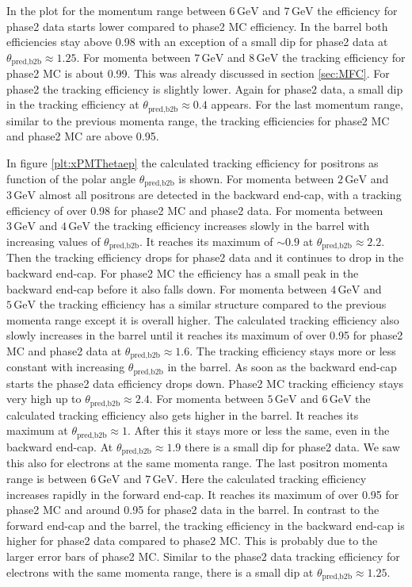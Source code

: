 \documentclass[a4paper,11pt,twosided,final,german,openbib,pdftex,listof=totoc,bibliography=totoc]{scrbook}
\begin{document}
In the plot for the momentum range between $6\,\textrm{GeV}$ and $7\,\textrm{GeV}$ the efficiency for phase2 data starts lower compared to phase2 MC efficiency. In the barrel both efficiencies stay above 0.98 with an exception of a small dip for phase2 data at $\theta_{\textrm{pred,b2b}} \approx 1.25$. 
For momenta  between $7\,\textrm{GeV}$ and $8\,\textrm{GeV}$ the tracking efficiency for phase2 MC is about 0.99. This was already discussed in section \ref{sec:MFC}. For phase2 the tracking efficiency is slightly lower. Again for phase2 data, a small dip in the tracking efficiency at $\theta_{\textrm{pred,b2b}} \approx 0.4$ appears. 
For the last momentum range, similar to the previous momenta range, the tracking efficiencies for phase2 MC and phase2 MC are above 0.95.
 

In figure \ref{plt:xPMThetaep} the calculated tracking efficiency for positrons as function of the polar angle $\theta_{\textrm{pred,b2b}}$ is shown. For momenta between $2\,\textrm{GeV}$ and $3\,\textrm{GeV}$ almost all positrons are detected in the backward end-cap, with a tracking efficiency of over 0.98 for phase2 MC and phase2 data. 
For momenta between $3\,\textrm{GeV}$ and $4\,\textrm{GeV}$ the tracking efficiency increases slowly in the barrel with increasing values of $\theta_{\textrm{pred,b2b}}$. It reaches its maximum of $\sim 0.9$ at $\theta_{\textrm{pred,b2b}} \approx 2.2$. Then the tracking efficiency drops for phase2 data and it continues to drop in the backward end-cap. For phase2 MC the efficiency has a small peak in the backward end-cap before it also falls down. 
For momenta between $4\,\textrm{GeV}$ and $5\,\textrm{GeV}$ the tracking efficiency has a similar structure compared to the previous momenta range except it is overall higher. The calculated tracking efficiency also slowly increases in the barrel until it reaches its maximum of over 0.95 for phase2 MC and phase2 data at $\theta_{\textrm{pred,b2b}} \approx 1.6$. The tracking efficiency stays more or less constant with increasing $\theta_{\textrm{pred,b2b}}$ in the barrel. As soon as the backward end-cap starts the phase2 data efficiency drops down. Phase2 MC tracking efficiency stays very high up to $\theta_{\textrm{pred,b2b}} \approx 2.4$.
For momenta between $5\,\textrm{GeV}$ and $6\,\textrm{GeV}$ the calculated tracking efficiency also gets higher in the barrel. It reaches its maximum at $\theta_{\textrm{pred,b2b}} \approx 1$. After this it stays more or less the same, even in the backward end-cap. At $\theta_{\textrm{pred,b2b}} \approx 1.9$ there is a small dip for phase2 data. We saw this also for electrons at the same momenta range.
The last positron momenta range is between $6\,\textrm{GeV}$ and $7\,\textrm{GeV}$. Here the calculated tracking efficiency increases rapidly in the forward end-cap. It reaches its maximum of over 0.95 for phase2 MC and around 0.95 for phase2 data in the barrel. In contrast to the forward end-cap and the barrel, the tracking efficiency in the backward end-cap is higher for phase2 data compared to phase2 MC. This is probably due to the larger error bars of phase2 MC. Similar to the phase2 data tracking efficiency for electrons with the same momenta range, there is a small dip at $\theta_{\textrm{pred,b2b}} \approx 1.25$.
\end{document}
